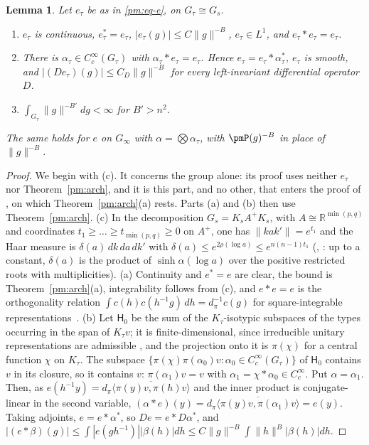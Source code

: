 \documentclass[10pt]{amsart}
\newtheorem{lemma}[theorem]{Lemma}
\theoremstyle{definition}
\theoremstyle{remark}
\newcommand{\R}{\mathbb R}
\providecommand{\aubar}[1]{\overline{#1}}
\begin{document}
\begin{lemma}\label{pm:kernel}
Let $e_\tau$ be as in \eqref{pm:eq-e}, on $G_\tau\cong G_s$.
\begin{enumerate}
\item[(a)] $e_\tau$ is continuous, $e_\tau^*=e_\tau$, $|e_\tau(g)|\le C\|g\|^{-B}$,
$e_\tau\in L^1$, and $e_\tau*e_\tau=e_\tau$.
\item[(b)] There is $\alpha_\tau\in C_c^\infty(G_\tau)$ with $\alpha_\tau*e_\tau=e_\tau$. Hence
$e_\tau=e_\tau*\alpha_\tau^*$, $e_\tau$ is smooth, and $|(De_\tau)(g)|\le C_D\|g\|^{-B}$ for every
left-invariant differential operator $D$.
\item[(c)] $\int_{G_\tau}\|g\|^{-B'}dg<\infty$ for $B'>n^2$.
\end{enumerate}
The same holds for $e$ on $G_\infty$ with $\alpha=\bigotimes\alpha_\tau$, with $\pmP(g)^{-B}$ in place
of $\|g\|^{-B}$.
\end{lemma}
\begin{proof} We begin with (c). It concerns the group alone: its proof uses neither $e_\tau$ nor Theorem~\ref{pm:arch}, and it is this part, and no other, that enters the proof of {\cite[Lemma~3.25]{P49}}, on which Theorem~\ref{pm:arch}(a) rests. Parts (a) and (b) then use Theorem~\ref{pm:arch}.
(c) In the decomposition $G_s=K_sA^+K_s$, with $A\cong\R^{\min(p,q)}$ and coordinates
$t_1\ge\dots\ge t_{\min(p,q)}\ge0$ on $A^+$, one has $\|kak'\|=e^{t_1}$ and the Haar measure is
$\delta(a)\,dk\,da\,dk'$ with $\delta(a)\le e^{2\rho(\log a)}\le e^{n(n-1)t_1}$
(\cite[Ch.~I, \S5, no.~2]{Helgason}, \cite[Lemma~2.4.2]{WallachRRG1}: up to a constant, $\delta(a)$ is the product of $\sinh\alpha(\log a)$ over the positive restricted roots with multiplicities). (a) Continuity and $e^*=e$ are clear, the bound is
Theorem~\ref{pm:arch}(a), integrability follows from (c), and $e*e=e$ is the orthogonality relation
$\int c(h)c(h^{-1}g)\,dh=d_\pi^{-1}c(g)$ for square-integrable
representations~\cite[Proposition~9.6, p.~284]{Knapp}. (b) Let $\mathsf H_0$ be the sum of the $K_\tau$-isotypic
subspaces of the types occurring in the span of $K_\tau v$; it is finite-dimensional, since
irreducible unitary representations are admissible \cite[Theorem~8.1, p.~205]{Knapp}, and the projection
onto it is $\pi(\chi)$ for a central function $\chi$ on $K_\tau$. The subspace
$\{\pi(\chi)\pi(\alpha_0)v:\alpha_0\in C_c^\infty(G_\tau)\}$ of $\mathsf H_0$ contains $v$ in its
closure, so it contains $v$: $\pi(\alpha_1)v=v$ with $\alpha_1=\chi*\alpha_0\in C_c^\infty$. Put
$\alpha=\alpha_1$. Then, as $e(h^{-1}y)=d_\pi\aubar{\langle\pi(y)v,\pi(h)v\rangle}$ and the inner product is conjugate-linear in the second variable, $(\alpha*e)(y)=d_\pi\aubar{\langle\pi(y)v,\pi(\alpha_1)v\rangle}=e(y)$.
Taking adjoints, $e=e*\alpha^*$, so $De=e*D\alpha^*$, and $|(e*\beta)(g)|\le
\int|e(gh^{-1})||\beta(h)|dh\le C\|g\|^{-B}\int\|h\|^B|\beta(h)|dh$.
\end{proof}
\end{document}
